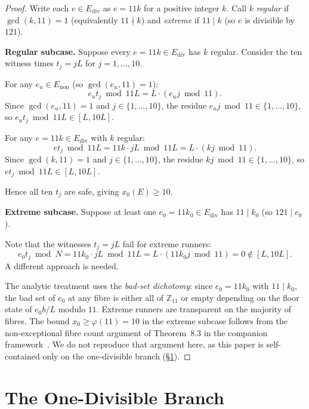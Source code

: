 \documentclass[11pt]{article}
\theoremstyle{definition}
\newcommand{\Ediv}{E_{\mathrm{div}}}
\newcommand{\Enon}{E_{\mathrm{non}}}
\begin{document}
\begin{proof}
  Write each $e \in \Ediv$ as $e = 11k$ for a positive integer $k$.
  Call $k$ \emph{regular} if $\gcd(k, 11) = 1$ (equivalently $11 \nmid k$)
  and \emph{extreme} if $11 \mid k$ (so $e$ is divisible by $121$).

  \smallskip
  \noindent\textbf{Regular subcase.}
  Suppose every $e = 11k \in \Ediv$ has $k$ regular.
  Consider the ten witness times $t_j = jL$ for $j = 1, \ldots, 10$.

  For any $e_u \in \Enon$ (so $\gcd(e_u, 11) = 1$):
  \[
    e_u t_j \bmod 11L = L \cdot (e_u j \bmod 11).
  \]
  Since $\gcd(e_u, 11) = 1$ and $j \in \{1,\ldots,10\}$, the residue
  $e_u j \bmod 11 \in \{1,\ldots,10\}$, so $e_u t_j \bmod 11L \in [L, 10L]$.

  For any $e = 11k \in \Ediv$ with $k$ regular:
  \[
    e t_j \bmod 11L = 11k \cdot jL \bmod 11L = L \cdot (kj \bmod 11).
  \]
  Since $\gcd(k, 11) = 1$ and $j \in \{1,\ldots,10\}$, the residue
  $kj \bmod 11 \in \{1,\ldots,10\}$, so $e t_j \bmod 11L \in [L, 10L]$.

  Hence all ten $t_j$ are safe, giving $x_0(E) \geq 10$.

  \smallskip
  \noindent\textbf{Extreme subcase.}
  Suppose at least one $e_0 = 11k_0 \in \Ediv$ has $11 \mid k_0$
  (so $121 \mid e_0$).

  Note that the witnesses $t_j = jL$ fail for extreme runners:
  \[
    e_0 t_j \bmod N = 11k_0 \cdot jL \bmod 11L
      = L \cdot (11 k_0 j \bmod 11) = 0 \notin [L, 10L].
  \]
  A different approach is needed.

  The analytic treatment uses the \emph{bad-set dichotomy}: since
  $e_0 = 11k_0$ with $11 \mid k_0$, the bad set of $e_0$ at any fibre
  is either all of $\mathbb{Z}_{11}$ or empty depending on the floor state
  of $e_0 b/L$ modulo $11$.
  Extreme runners are transparent on the majority of fibres.
  The bound $x_0 \geq \varphi(11) = 10$ in the extreme subcase follows
  from the non-exceptional fibre count argument of Theorem~8.3 in the
  companion framework~\cite{Pal26}.
  We do not reproduce that argument here, as this paper is self-contained
  only on the one-divisible branch (\S\ref{sec:onediv}).
\end{proof}

\section{The One-Divisible Branch}
\label{sec:onediv}
\end{document}
